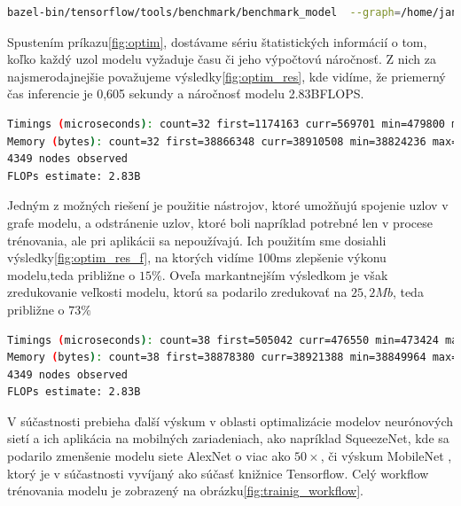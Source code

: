 \begin{lstlisting}[language=Bash, label={fig:optim}, caption={Spustenie procesu analýzy modelu}]
bazel-bin/tensorflow/tools/benchmark/benchmark_model  --graph=/home/jan/models/facenet/20170512-110547.pb  --input_layer="input:0,phase_train,batch_size"  --input_layer_shape="1,160,160,3::1"  --input_layer_type="float,bool,int32"  --output_layer="embeddings:0"  --show_run_order=false  --show_time=false  --show_memory=false  --show_summary=true  --show_flops=true
\end{lstlisting}


\indent Spustením príkazu\ref{fig:optim}, dostávame sériu štatistických informácií o tom, koľko každý uzol modelu vyžaduje času či jeho výpočtovú náročnosť.
Z nich za najsmerodajnejšie považujeme výsledky\ref{fig:optim_res}, kde vidíme, že priemerný čas inferencie je 0,605 sekundy a náročnosť modelu 2.83BFLOPS.

\begin{lstlisting}[language=Bash, label={fig:optim_res}, caption={Výsledky analýzy modelu}]
Timings (microseconds): count=32 first=1174163 curr=569701 min=479800 max=1174163 avg=605828 std=138948
Memory (bytes): count=32 first=38866348 curr=38910508 min=38824236 max=39015084 avg=3.89352e+07 std=46903
4349 nodes observed
FLOPs estimate: 2.83B
\end{lstlisting}

\indent Jedným z možných riešení je použitie nástrojov, ktoré umožňujú spojenie uzlov v grafe modelu, a odstránenie uzlov, ktoré boli napríklad potrebné len v procese trénovania, ale pri aplikácii sa nepoužívajú.
Ich použitím sme dosiahli výsledky\ref{fig:optim_res_f}, na ktorých vidíme 100ms zlepšenie výkonu modelu,teda približne o $ 15\% $.
Oveľa markantnejším výsledkom je však zredukovanie veľkosti modelu, ktorú sa podarilo zredukovať na $ 25,2Mb $, teda približne o $ 73\%  $

\begin{lstlisting}[language=Bash, label={fig:optim_res_f}, caption={Výsledky analýzy modelu po optimalizácii}]
Timings (microseconds): count=38 first=505042 curr=476550 min=473424 max=676329 avg=506505 std=34466
Memory (bytes): count=38 first=38878380 curr=38921388 min=38849964 max=39028268 avg=3.89496e+07 std=47100
4349 nodes observed
FLOPs estimate: 2.83B
\end{lstlisting}

\indent V súčastnosti prebieha ďalší výskum v oblasti optimalizácie modelov neurónových sietí a ich aplikácia na mobilných zariadeniach, ako napríklad SqueezeNet\cite{IandolaMAHDK16}, kde sa podarilo zmenšenie modelu siete AlexNet o viac ako $ 50 \times $, či výskum MobileNet \cite{HowardZCKWWAA17}, ktorý je v súčastnosti vyvíjaný ako súčasť knižnice Tensorflow. 
Celý workflow trénovania modelu je zobrazený na obrázku\ref{fig:trainig_workflow}.

